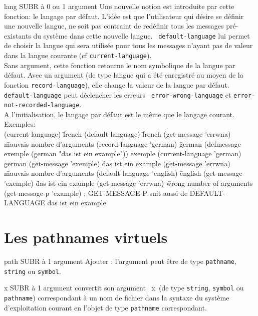 
 {lang} {SUBR \`{a} 0 ou 1 argument}
Une nouvelle notion est introduite par cette fonction: le langage par
d\'{e}faut. L'id\'{e}e est que l'utilisateur qui d\'{e}sire se d\'{e}finir une
nouvelle langue, ne soit pas contraint de red\'{e}finir tous les messages
pr\'{e}-existants du syst\`{e}me dans cette nouvelle langue. {\tt
default-language} lui permet de choisir la langue qui sera utilis\'{e}e
pour tous les messages n'ayant pas de valeur dans la langue courante
(cf {\tt current-language}). \\
Sans argument, cette fonction retourne le nom symbolique de la langue
par d\'{e}faut. Avec un argument (de type langue qui a \'{e}t\'{e} enregistr\'{e}
au moyen de la fonction {\tt record-language}), elle change la valeur
de la langue par d\'{e}faut.\\
{\tt default-language} peut d\'{e}clencher les erreurs {\tt
error-wrong-language} et  {\tt error-not-recorded-language}.\\
A l'initialisation, le langage par d\'{e}faut est le m\^{e}me que le langage
courant. \\

Exemples:\\
\? {(current-language)}
\= {french}
\? {(default-language)}
\= {french}
\? {(get-message 'errwna)}
\= {mauvais nombre d'arguments}
\? {(record-language 'german)}
\= {german}
\? {(defmessage exemple (german "das ist ein example"))}
\= {exemple}
\? {(current-language 'german)}
\= {german}
\? {(get-message 'exemple)}
\= {das ist ein example}
\? {(get-message 'errwna)}
\= {mauvais nombre d'arguments}
\? {(default-language 'english)}
\= {english}
\? {(get-message 'exemple)}
\= {das ist ein example}
\? {(get-message 'errwna)}
\= {wrong number of arguments}
\? {(get-message-p 'example) ; GET-MESSAGE-P suit aussi de DEFAULT-LANGUAGE}
\= {das ist ein example}


\chapter {Les pathnames virtuels}


 {path} {SUBR \`{a} 1 argument}
Ajouter : l'argument peut \^{e}tre de type {\tt pathname}, {\tt string} 
ou {\tt symbol}.

 {x} {SUBR \`{a} 1 argument}
convertit son argument \LT\ x\GT\ (de type {\tt string}, {\tt symbol} ou
{\tt pathname}) correspondant
\`{a} un nom de fichier dans la syntaxe du syst\`{e}me d'exploitation courant en
l'objet de type {\tt pathname} correspondant.

